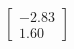 \documentclass[preview]{standalone}
\begin{document}
\begin{align*}
\begin{bmatrix} -2.83 \\ 1.60 \end{bmatrix}
\end{align*}
\end{document}
